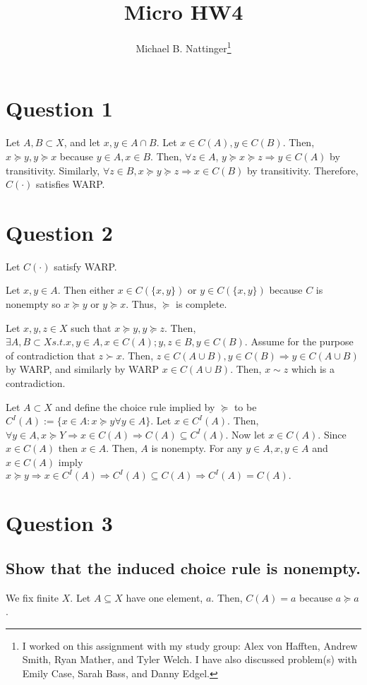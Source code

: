 \documentclass[11pt]{article} %
\title{Micro HW4}
\author{Michael B. Nattinger\footnote{I worked on this assignment with my study group: Alex von Hafften, Andrew Smith, Ryan Mather, and Tyler Welch. I have also discussed problem(s) with Emily Case, Sarah Bass, and Danny Edgel.}}
\begin{document}
\maketitle

\section{Question 1}
Let $A,B \subset X$, and let $x,y\in A\cap B.$ Let $x \in C(A),y \in C(B)$. Then, $x \succeq y,y \succeq x$ because $y\in A,x \in B$. Then, $\forall z\in A$, $y\succeq x \succeq z \Rightarrow y \in C(A)$ by transitivity. Similarly, $\forall z \in B, x\succeq y \succeq z \Rightarrow x \in C(B)$ by transitivity. Therefore, $C(\cdot)$ satisfies WARP.
  
\section{Question 2}
Let $C(\cdot)$ satisfy WARP. 

Let $x,y \in A.$ Then either $x\in C(\{ x,y\})$ or $y\in C(\{ x,y\})$ because $C$ is nonempty so $x\succeq y$ or $y \succeq x$. Thus, $\succeq$ is complete.

Let $x,y,z \in X$ such that $x\succeq y,y\succeq z.$ Then, $\exists A,B\subset X s.t. x,y\in A, x \in C(A);y,z\in B, y \in C(B).$ Assume for the purpose of contradiction that $z\succ x$. Then, $z\in C(A\cup B), y\in C(B) \Rightarrow y \in C(A \cup B)$ by WARP, and similarly by WARP $x \in C(A\cup B).$ Then, $x\sim z$ which is a contradiction.

Let $A\subset X$ and define the choice rule implied by $\succeq$ to be $C^I(A) := \{x\in A : x \succeq y \forall y \in A \}$. Let $x \in C^I(A).$ Then, $\forall y \in A, x \succeq Y \Rightarrow x \in C(A) \Rightarrow C(A)\subseteq C^I(A)$. Now let $x \in C(A).$ Since $x\in C(A)$ then $x\in A$. Then, $A$ is nonempty. For any $y \in A, x,y\in A$ and $x\in C(A)$ imply $ x\succeq y \Rightarrow x \in C^I(A) \Rightarrow C^I(A) \subseteq C(A)\Rightarrow C^I(A) = C(A).$ 
\section{Question 3}
\subsection{Show that the induced choice rule is nonempty.}
We fix finite $X$. Let $A \subseteq X$ have one element, $a$. Then, $C(A) = a$ because $a\succeq a$.
\end{document}
